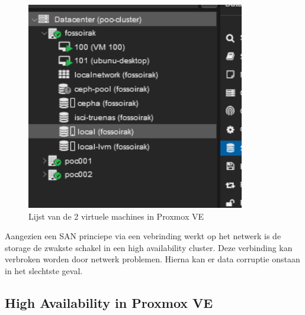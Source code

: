 \begin{figure}[H]
  \centering
  \includegraphics[width=0.85\textwidth]{../poc/vm-lijst-prox.png}
  \caption{Lijst van de 2 virtuele machines in Proxmox VE}
  \label{fig:vm-lijst}
\end{figure}
Aangezien een SAN princiepe via een vebrinding werkt op het netwerk is de storage de zwakste schakel in een high availability cluster. Deze verbinding kan verbroken worden door netwerk problemen. Hierna kan er data corruptie onstaan in het slechtste geval.

\subsection{High Availability in Proxmox VE}

